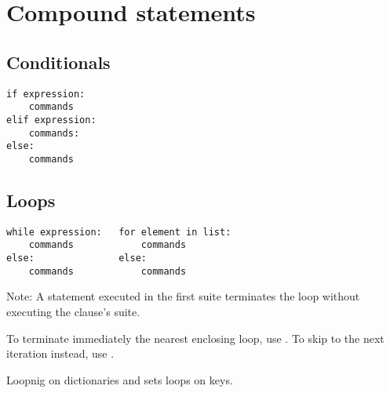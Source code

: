 \section{Compound statements}
\subsection{Conditionals}
\begin{verbatim}
if expression:
    commands
elif expression:
    commands:
else:
    commands
\end{verbatim}

\subsection{Loops}
\begin{verbatim}
while expression:   for element in list:
    commands            commands
else:               else:
    commands            commands
\end{verbatim}

Note: A  statement executed in the first suite terminates 
the loop without executing the  clause's suite.

To terminate immediately the nearest enclosing loop, use .
To skip to the next iteration instead, use .

Loopnig on dictionaries and sets loops on keys.
